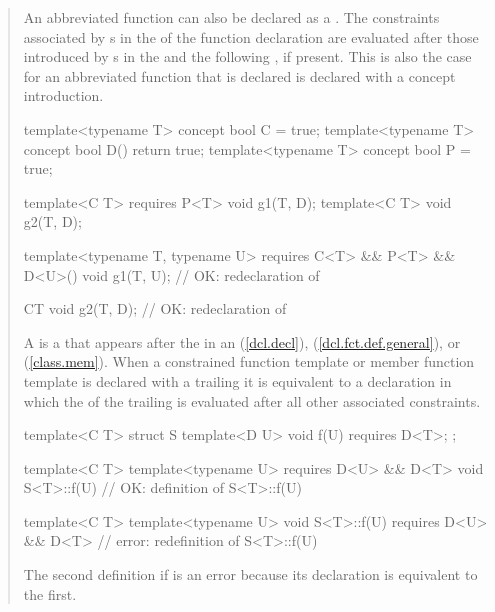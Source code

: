 \begin{quote}
\pnum
An abbreviated function can also be declared as a
. The constraints
associated by s
in the  of
the function declaration are evaluated after those introduced by
s in the
 and the
following , if present.
This is also the case for an abbreviated function that is declared
is declared with a concept introduction.
% 
\enterexample
\begin{codeblock}
template<typename T> concept bool C = true;
template<typename T> concept bool D() { return true; }
template<typename T> concept bool P = true;

template<C T> requires P<T> void g1(T, D);
template<C T> void g2(T, D);

template<typename T, typename U>
  requires C<T> && P<T> && D<U>()
    void g1(T, U);      // OK: redeclaration of 

C{T} void g2(T, D); // OK: redeclaration of 
\end{codeblock}
\exitexample


\pnum
A  
is a  that appears after
the  in an
(\ref{dcl.decl}),
(\ref{dcl.fct.def.general}), or
(\ref{class.mem}).
% 
When a constrained function template or member function template is
declared with a trailing 
it is equivalent to a declaration in which the 
 of the
trailing  is evaluated
after all other associated constraints.
% 
\enterexample
\begin{codeblock}
template<C T> struct S {
  template<D U> void f(U) requires D<T>;
};

template<C T> template<typename U>
    requires D<U> && D<T>
      void S<T>::f(U) { } // OK: definition of S<T>::f(U)

template<C T> template<typename U>
    void S<T>::f(U) requires D<U> && D<T> { } // error: redefinition of S<T>::f(U)
  \end{codeblock}
  The second definition if  is an error 
  because its declaration is equivalent to the first.
\exitexample
\end{quote}

